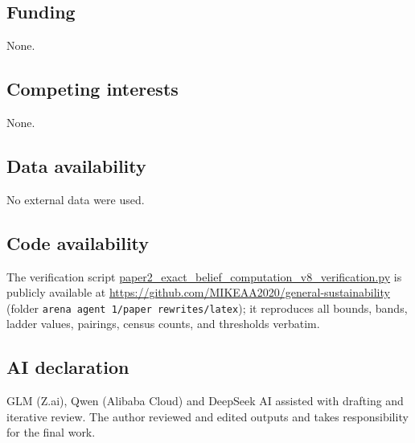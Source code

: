 \documentclass[10pt,twocolumn]{article}
\theoremstyle{plain}
\theoremstyle{definition}
\theoremstyle{remark}
\begin{document}
\subsection*{Funding}
None.

\subsection*{Competing interests}
None.

\subsection*{Data availability}
No external data were used.

\subsection*{Code availability}
The verification script
\url{paper2_exact_belief_computation_v8_verification.py} is publicly
available at \url{https://github.com/MIKEAA2020/general-sustainability}
(folder \texttt{arena agent 1/paper rewrites/latex}); it reproduces all bounds, bands, ladder values, pairings,
census counts, and thresholds verbatim.

\subsection*{AI declaration}
GLM (Z.ai), Qwen (Alibaba Cloud) and DeepSeek AI assisted with drafting
and iterative review. The author reviewed and edited outputs and takes
responsibility for the final work.
\end{document}
